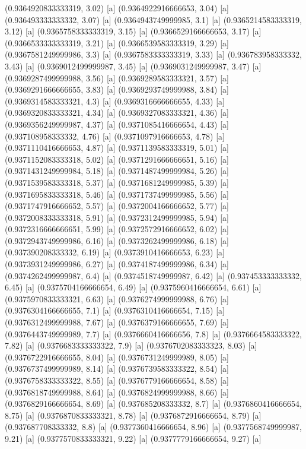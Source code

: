 {{{(0.9364920833333319, 3.02) [a] 
(0.9364922916666653, 3.04) [a] 
(0.936493333333332, 3.07) [a] 
(0.9364943749999985, 3.1) [a] 
(0.9365214583333319, 3.12) [a] 
(0.9365758333333319, 3.15) [a] 
(0.9366529166666653, 3.17) [a] 
(0.9366533333333319, 3.21) [a] 
(0.9366539583333319, 3.29) [a] 
(0.9367581249999986, 3.3) [a] 
(0.9367583333333319, 3.33) [a] 
(0.936783958333332, 3.43) [a] 
(0.9369012499999987, 3.45) [a] 
(0.9369031249999987, 3.47) [a] 
(0.9369287499999988, 3.56) [a] 
(0.9369289583333321, 3.57) [a] 
(0.9369291666666655, 3.83) [a] 
(0.9369293749999988, 3.84) [a] 
(0.9369314583333321, 4.3) [a] 
(0.9369316666666655, 4.33) [a] 
(0.9369320833333321, 4.34) [a] 
(0.9369327083333321, 4.36) [a] 
(0.9369356249999987, 4.37) [a] 
(0.9371085416666654, 4.43) [a] 
(0.937108958333332, 4.76) [a] 
(0.9371097916666653, 4.78) [a] 
(0.9371110416666653, 4.87) [a] 
(0.9371139583333319, 5.01) [a] 
(0.9371152083333318, 5.02) [a] 
(0.9371291666666651, 5.16) [a] 
(0.9371431249999984, 5.18) [a] 
(0.9371487499999984, 5.26) [a] 
(0.9371539583333318, 5.37) [a] 
(0.9371681249999985, 5.39) [a] 
(0.9371695833333318, 5.46) [a] 
(0.9371737499999985, 5.56) [a] 
(0.9371747916666652, 5.57) [a] 
(0.9372004166666652, 5.77) [a] 
(0.9372008333333318, 5.91) [a] 
(0.9372312499999985, 5.94) [a] 
(0.9372316666666651, 5.99) [a] 
(0.9372572916666652, 6.02) [a] 
(0.9372943749999986, 6.16) [a] 
(0.9373262499999986, 6.18) [a] 
(0.937390208333332, 6.19) [a] 
(0.9373910416666653, 6.23) [a] 
(0.9373931249999986, 6.27) [a] 
(0.9374187499999986, 6.34) [a] 
(0.9374262499999987, 6.4) [a] 
(0.9374518749999987, 6.42) [a] 
(0.937453333333332, 6.45) [a] 
(0.9375704166666654, 6.49) [a] 
(0.9375960416666654, 6.61) [a] 
(0.9375970833333321, 6.63) [a] 
(0.9376274999999988, 6.76) [a] 
(0.9376304166666655, 7.1) [a] 
(0.9376310416666654, 7.15) [a] 
(0.9376312499999988, 7.67) [a] 
(0.9376379166666655, 7.69) [a] 
(0.9376443749999989, 7.7) [a] 
(0.9376660416666656, 7.8) [a] 
(0.9376664583333322, 7.82) [a] 
(0.9376683333333322, 7.9) [a] 
(0.9376702083333323, 8.03) [a] 
(0.9376722916666655, 8.04) [a] 
(0.9376731249999989, 8.05) [a] 
(0.9376737499999989, 8.14) [a] 
(0.9376739583333322, 8.54) [a] 
(0.9376758333333322, 8.55) [a] 
(0.9376779166666654, 8.58) [a] 
(0.9376818749999988, 8.64) [a] 
(0.9376824999999988, 8.66) [a] 
(0.9376829166666654, 8.69) [a] 
(0.937685208333332, 8.7) [a] 
(0.9376860416666654, 8.75) [a] 
(0.9376870833333321, 8.78) [a] 
(0.9376872916666654, 8.79) [a] 
(0.937687708333332, 8.8) [a] 
(0.9377360416666654, 8.96) [a] 
(0.9377568749999987, 9.21) [a] 
(0.9377570833333321, 9.22) [a] 
(0.9377779166666654, 9.27) [a] 
}}}
